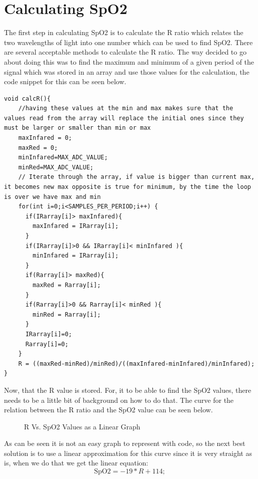 \documentclass{article}
\begin{document}
\section{Calculating SpO2}
The first step in calculating SpO2 is to calculate the R ratio which relates the two wavelengths of light into one number which can be used to find SpO2. There are several acceptable methods to calculate the R ratio. The way decided to go about doing this was to find the maximum and minimum of a given period of the signal which was stored in an array and use those values for the calculation, the code snippet for this can be seen below.
\begin{lstlisting}[language=Arduino, caption= R Calculation Code]
void calcR(){
    //having these values at the min and max makes sure that the values read from the array will replace the initial ones since they must be larger or smaller than min or max
    maxInfared = 0; 
    maxRed = 0; 
    minInfared=MAX_ADC_VALUE; 
    minRed=MAX_ADC_VALUE;
    // Iterate through the array, if value is bigger than current max, it becomes new max opposite is true for minimum, by the time the loop is over we have max and min
    for(int i=0;i<SAMPLES_PER_PERIOD;i++) {
      if(IRarray[i]> maxInfared){
        maxInfared = IRarray[i];
      } 
      if(IRarray[i]>0 && IRarray[i]< minInfared ){
        minInfared = IRarray[i];
      }
      if(Rarray[i]> maxRed){
        maxRed = Rarray[i];
      }
      if(Rarray[i]>0 && Rarray[i]< minRed ){
        minRed = Rarray[i];
      }
      IRarray[i]=0;
      Rarray[i]=0;
    }
    R = ((maxRed-minRed)/minRed)/((maxInfared-minInfared)/minInfared);
}
\end{lstlisting}
Now, that the R value is stored. For, it to be able to find the SpO2 values, there needs to be a little bit of background on how to do that. The curve for the relation between the R ratio and the SpO2 value can be seen below.
\begin{figure}[h]
    \centering
    \caption{R Vs. SpO2 Values as a Linear Graph}
    \label{figure:SpO2LinearGraph}
\end{figure}
As can be seen it is not an easy graph to represent with code, so the next best solution is to use a linear approximation for this curve since it is very straight as is, when we do that we get the linear equation:
\begin{equation}
    \text{SpO2} = -19 * R + 114;
\end{equation}
\newpage
\end{document}
